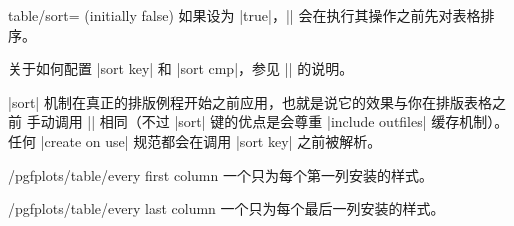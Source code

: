 \documentclass[a4paper,doc2]{ltxdoc}
\begin{document}
\begin{pgfplotskey}{table/sort= (initially false)}
    如果设为 |true|，|\pgfplotstabletypeset| 会在执行其操作之前先对表格排序。

    关于如何配置 |sort key| 和 |sort cmp|，参见 |\pgfplotstablesort| 的说明。
\begin{codeexample}[]
\end{codeexample}

    |sort| 机制在真正的排版例程开始之前应用，也就是说它的效果与你在排版表格之前
    手动调用 |\pgfplotstablesort| 相同（不过 |sort| 键的优点是会尊重 |include outfiles|
    缓存机制）。任何 |create on use| 规范都会在调用 |sort key| 之前被解析。

\end{pgfplotskey}

\begin{stylekey}{/pgfplots/table/every first column}
    一个只为每个第一列安装的样式。
\begin{codeexample}[narrow]
\end{codeexample}
\end{stylekey}

\begin{stylekey}{/pgfplots/table/every last column}
    一个只为每个最后一列安装的样式。
\end{stylekey}
\end{document}
